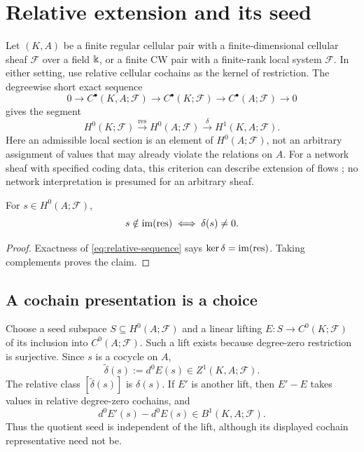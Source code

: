 \documentclass[11pt,a4paper]{article}
\begin{document}
\section{Relative extension and its seed}
\label{sec:relative}

Let $(K,A)$ be a finite regular cellular pair with a finite-dimensional
cellular sheaf $\mathcal F$ over a field $\Bbbk$, or a finite CW pair with
a finite-rank local system $\mathcal F$.  In either setting, use relative
cellular cochains as the kernel of restriction.  The degreewise short exact
sequence
\[
 0\to C^\bullet(K,A;\mathcal F)\to C^\bullet(K;\mathcal F)
       \to C^\bullet(A;\mathcal F)\to0
\]
gives the segment
\begin{equation}\label{eq:relative-sequence}
 H^0(K;\mathcal F)\xrightarrow{\mathrm{res}}H^0(A;\mathcal F)
               \xrightarrow{\delta}H^1(K,A;\mathcal F).
\end{equation}
Here an admissible local section is an element of $H^0(A;\mathcal F)$,
not an arbitrary assignment of values that may already violate the
relations on $A$.  For a network sheaf with specified coding data, this
criterion can describe extension of flows \cite{ghrist-hiraoka}; no
network interpretation is presumed for an arbitrary sheaf.

\begin{theorem}\label{thm:relative}
For $s\in H^0(A;\mathcal F)$,
\[
 s\notin\operatorname{im}(\mathrm{res})\iff\delta(s)\ne0.
\]
\end{theorem}

\begin{proof}
Exactness of \cref{eq:relative-sequence} says
$\ker\delta=\operatorname{im}(\mathrm{res})$.  Taking complements proves the claim.
\end{proof}

\subsection{A cochain presentation is a choice}

Choose a seed subspace $S\subseteq H^0(A;\mathcal F)$ and a linear
lifting $E:S\to C^0(K;\mathcal F)$ of its inclusion into
$C^0(A;\mathcal F)$.  Such a lift exists because degree-zero restriction
is surjective.  Since $s$ is a cocycle on $A$,
\[
 \widetilde\delta(s):=d^0E(s)\in Z^1(K,A;\mathcal F).
\]
The relative class $[\widetilde\delta(s)]$ is $\delta(s)$.
If $E'$ is another lift, then $E'-E$ takes values in relative degree-zero
cochains, and
\[
 d^0E'(s)-d^0E(s)\in B^1(K,A;\mathcal F).
\]
Thus the quotient seed is independent of the lift, although its displayed
cochain representative need not be.
\end{document}
